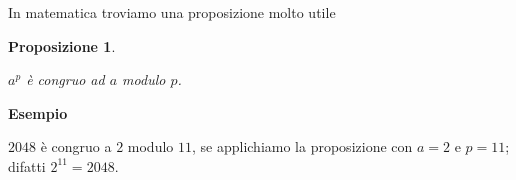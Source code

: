\documentclass[8pt]{beamer}
\theoremstyle{plain}
\newtheorem{prop}[thm]{Proposizione}
\theoremstyle{definition}
\begin{document}
\begin{frame}
\begin{center}

In matematica troviamo una proposizione molto utile

\medskip
\medskip

\begin{prop}\begin{center}
$a^p$ è congruo ad $a$ modulo $p$.
\end{center}\end{prop}

% 
% 

\bigskip
\bigskip

\textbf{Esempio} 

\medskip

$2048$ è congruo a $2$ modulo $11$, se applichiamo la proposizione con $\mathit{a=2}$ e $\mathit{p=11}$; \\ difatti $2^{11} = 2048$.

\end{center}
\end{frame}
\end{document}
